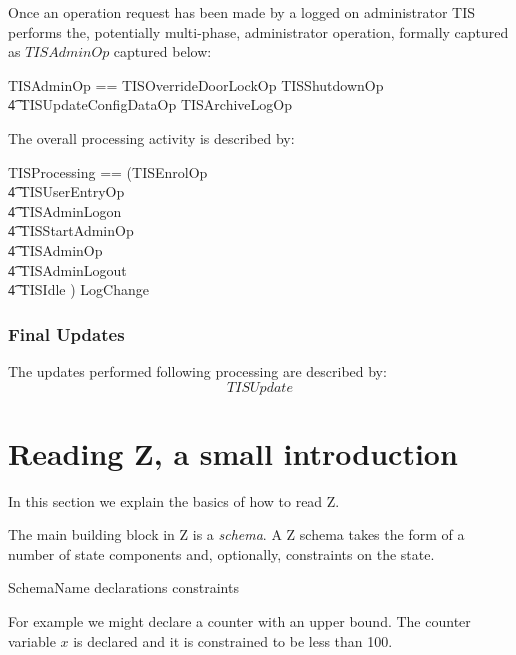 Once an operation request has been made by a logged on administrator
TIS performs the, potentially multi-phase, administrator operation,
formally captured as $TISAdminOp$ captured below:

\begin{zed}
        TISAdminOp == TISOverrideDoorLockOp  \lor TISShutdownOp 
\\      \t4     \lor TISUpdateConfigDataOp \lor TISArchiveLogOp
\end{zed}

The overall processing activity is described by:

\begin{zed}
        TISProcessing == (TISEnrolOp
\\ \t4  \lor TISUserEntryOp
\\ \t4  \lor TISAdminLogon 
\\ \t4  \lor TISStartAdminOp
\\ \t4  \lor TISAdminOp 
\\ \t4  \lor TISAdminLogout
\\ \t4  \lor TISIdle ) \land LogChange
\end{zed}

\subsection{Final Updates}
The updates performed following processing are described by:
\[
        TISUpdate
\]


\chapter{Reading Z, a small introduction}
\label{chap:readZ}
In this section we explain the basics of how to read Z. 

The main building block in Z is a {\em schema}. 
A Z schema takes the form of a number of state components and,
optionally, constraints on the state.

\begin{schema}{SchemaName}
        declarations
\where
        constraints
\end{schema} 

For example we might declare a counter with an upper bound. The
counter variable $x$ is declared and it is constrained
to be less than 100.

